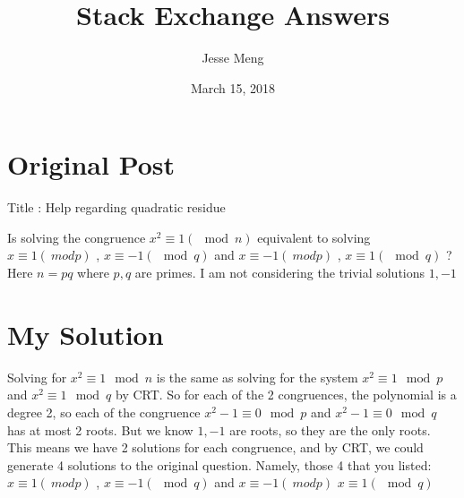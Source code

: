\documentclass{article}
\title{Stack Exchange Answers}
\author{Jesse Meng }
\date{March 15, 2018}
\begin{document}
\maketitle

\section{Original Post}
Title : Help regarding quadratic residue

Is solving the congruence $x^2 \equiv 1 (\mod n)$ equivalent to solving $x \equiv 1(\ mod p)$ , $x \equiv -1 (\mod q)$  and $x \equiv -1(\ mod p)$ , $x \equiv 1 (\mod q)$  ? Here $n=pq$ where $p,q$ are primes.
I am not considering the trivial solutions  $1,-1$

\section{My Solution}
Solving for $x^2\equiv1 \mod n$ is the same as solving for the system  $x^2\equiv1 \mod p$ and  $x^2\equiv1 \mod q$ by CRT. So for each of the 2 congruences, the polynomial is a degree 2, so each of the congruence $x^2-1\equiv0 \mod p$ and $x^2-1\equiv0 \mod q$ has at most 2 roots. But we know $1,-1$ are roots, so they are the only roots. This means we have 2 solutions for each congruence, and by CRT, we could generate 4 solutions to the original question. Namely, those 4 that you listed: $x \equiv 1(\ mod p)$ , $x \equiv -1 (\mod q)$  and $x \equiv -1(\ mod p)$ $x \equiv 1 (\mod q)$
\end{document}
